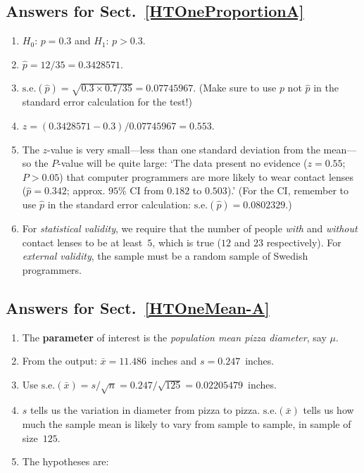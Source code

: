 \documentclass[
  11pt,
  a4paper,
  krantz2]{krantz}
\providecommand{\tightlist}{%
  \setlength{\itemsep}{0pt}\setlength{\parskip}{0pt}}
\begin{document}
\begin{footnotesize}
\subsection*{Answers for Sect.~\ref{HTOneProportionA}}\label{answers-for-sect.-refhtoneproportiona}

\begin{enumerate}
\def\labelenumi{\arabic{enumi}.}
\tightlist
\item
  \(H_0\): \(p = 0.3\) and \(H_1\): \(p > 0.3\).
\item
  \(\hat{p} = 12/35 = 0.3428571\).
\item
  \(\text{s.e.}(\hat{p})
  = \sqrt{0.3 \times 0.7/35} = 0.07745967\).
  (Make sure to use \(p\) not \(\hat{p}\) in the standard error calculation for the test!)
\item
  \(z = (0.3428571 - 0.3)/0.07745967 = 0.553\).
\item
  The \(z\)-value is very small---less than one standard deviation from the mean---so the \(P\)-value will be quite large:
  `The data present no evidence (\(z = 0.55\); \(P > 0.05\)) that computer programmers are more likely to wear contact lenses (\(\hat{p} = 0.342\); approx. \(95\)\% CI from \(0.182\) to \(0.503\)).'
  (For the CI, remember to use \(\hat{p}\) in the standard error calculation: \(\text{s.e.}(\hat{p}) = 0.0802329\).)
\item
  For \emph{statistical validity}, we require that the number of people \emph{with} and \emph{without} contact lenses to be at least~\(5\), which is true (\(12\) and \(23\) respectively).
  For \emph{external validity}, the sample must be a random sample of Swedish programmers.
\end{enumerate}

\subsection*{Answers for Sect.~\ref{HTOneMean-A}}\label{answers-for-sect.-refhtonemean-a}

\begin{enumerate}
\def\labelenumi{\arabic{enumi}.}
\item
  The \textbf{parameter} of interest is the \emph{population mean pizza diameter}, say \(\mu\).\tightlist
\item
  From the output: \(\bar{x} = 11.486\)~inches and \(s = 0.247\)~inches.
\item
  Use \(\text{s.e.}(\bar{x}) = s/\sqrt{n} = 0.247/\sqrt{125} = 0.02205479\)~inches.
\item
  \(s\) tells us the variation in diameter from pizza to pizza.
  \(\text{s.e.}(\bar{x})\) tells us how much the sample mean is likely to vary from sample to sample, in sample of size~\(125\).
\item
  The hypotheses are:


\end{enumerate}
\end{footnotesize}
\end{document}
